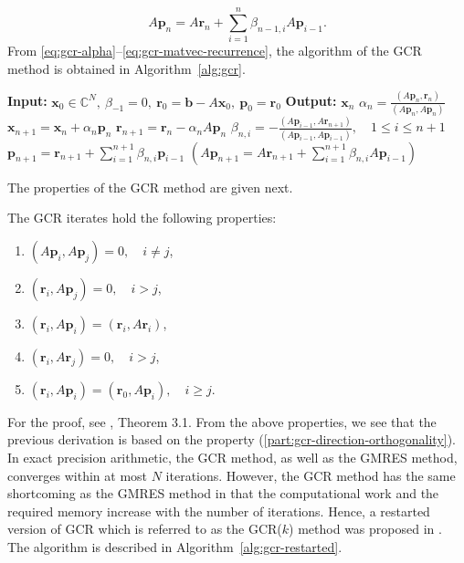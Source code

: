 \begin{equation}\label{eq:gcr-matvec-recurrence}A\bm p_n=A\bm r_n+\sum_{i=1}^n\beta_{n-1,i}A\bm p_{i-1}.\end{equation}
{From \eqref{eq:gcr-alpha}--\eqref{eq:gcr-matvec-recurrence}, the algorithm of the GCR method is obtained in Algorithm\ \ref{alg:gcr}.}
\begin{algorithm}[H]\caption{{The GCR method}}\label{alg:gcr}\begin{algorithmic}[1]
\Statex\textbf{Input:} $\bm x_0\in\mathbb C^N,\ \beta_{-1}=0,\ \bm r_0=\bm b-A\bm x_0,\ \bm p_0=\bm r_0$
\Statex\textbf{Output:} $\bm x_n$
\State $\alpha_n=\frac{(A\bm p_n,\bm r_n)}{(A\bm p_n,A\bm p_n)}$
\State $\bm x_{n+1}=\bm x_n+\alpha_n\bm p_n$
\State $\bm r_{n+1}=\bm r_n-\alpha_nA\bm p_n$
\State $\beta_{n,i}=-\frac{(A\bm p_{i-1},A\bm r_{n+1})}{(A\bm p_{i-1},A\bm p_{i-1})},\quad1\le i\le n+1$
\State $\bm p_{n+1}=\bm r_{n+1}+\sum_{i=1}^{n+1}\beta_{n,i}\bm p_{i-1}$
\State $(A\bm p_{n+1}=A\bm r_{n+1}+\sum_{i=1}^{n+1}\beta_{n,i}A\bm p_{i-1})$
\EndFor\end{algorithmic}\end{algorithm}
{The properties of the GCR method are given next.}
\par{}
\begin{Proposition}\label{prop:gcr-orthogonality}
{The GCR iterates hold the following properties:}
\begin{enumerate}[label=(G\arabic*),ref=G\arabic*]
\item\label{part:gcr-direction-orthogonality} $(A\bm p_i,A\bm p_j)=0,\quad i\ne j$,
\item $(\bm r_i,A\bm p_j)=0,\quad i>j$,
\item $(\bm r_i,A\bm p_i)=(\bm r_i,A\bm r_i)$,
\item $(\bm r_i,A\bm r_j)=0,\quad i>j$,
\item $(\bm r_i,A\bm p_i)=(\bm r_0,A\bm p_i),\quad i\ge j$.
\end{enumerate}\end{Proposition}
{For the proof, see , Theorem 3.1.}
{From the above properties, we see that the previous derivation is based on the property (\ref{part:gcr-direction-orthogonality}). In exact precision arithmetic, the GCR method, as well as the GMRES method, converges within at most $N$ iterations. However, the GCR method has the same shortcoming as the GMRES method in that the computational work and the required memory increase with the number of iterations. Hence, a restarted version of GCR which is referred to as the GCR($k$) method was proposed in . The algorithm is described in Algorithm\ \ref{alg:gcr-restarted}.}
